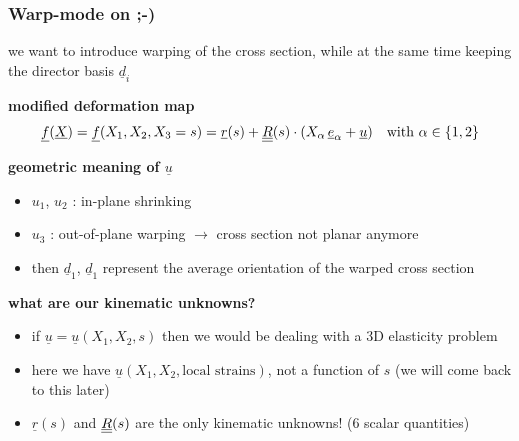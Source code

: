\begin{frame}
  \frametitle{Warp-mode on ;-)}
  
  we want to introduce warping of the cross section, \newline
  while at the same time keeping the director basis $\underline{d}_i$
  \vspace{0.6em}
  
  \textbf{modified deformation map}
  \begin{displaymath}
    \underline{f}(\underline{X}) = \underline{f}(X_1,X_2,X_3=s) = \underline{r}(s) + \underline{\underline{R}}(s) \cdot (X_{\alpha} \, \underline{e}_{\alpha} + \underline{u}) \quad \text{with } \alpha \in \{1,2\}
  \end{displaymath}
  
  \vspace{0.3em}
  \textbf{geometric meaning of $\underline{u}$}
  \begin{itemize}
    \item $u_1$, $u_2$ : in-plane shrinking
    \item $u_3$ : out-of-plane warping $\rightarrow$ cross section not planar anymore
    \item then $\underline{d}_1$, $\underline{d}_1$ represent the average orientation of the warped cross section
  \end{itemize}
  \vspace{0.6em}
  
  \textbf{what are our kinematic unknowns?}
  \begin{itemize}
    \item if $\underline{u} = \underline{u}(X_1,X_2,s)$ then we would be dealing with a 3D elasticity problem
    \item here we have $\underline{u}(X_1,X_2,\text{local strains})$, not a function of $s$ \newline (we will come back to this later)
    \item $\underline{r}(s)$ and $\underline{\underline{R}}(s)$ are the only kinematic unknowns! (6 scalar quantities)
  \end{itemize}
\end{frame}


